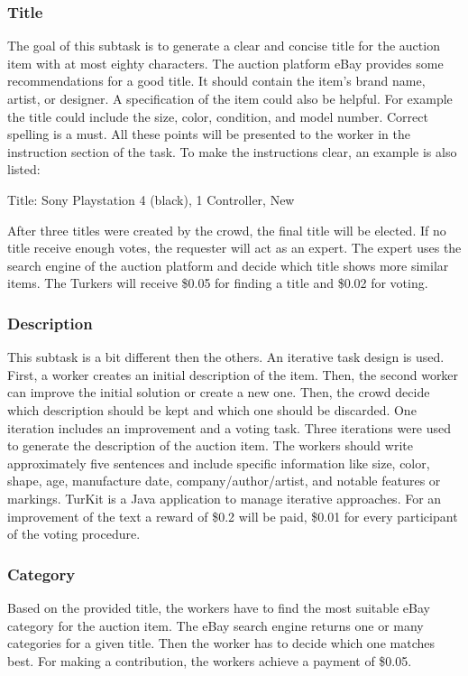 \subsubsection{Title}
The goal of this subtask is to generate a clear and concise title for the auction item with at most eighty characters. The auction platform eBay provides some recommendations for a good title. It should contain the item's brand name, artist, or designer. A specification of the item could also be helpful. For example the title could include the size, color, condition, and model number. Correct spelling is a must. All these points will be presented to the worker in the instruction section of the task. To make the instructions clear, an example is also listed: 

Title: Sony Playstation 4 (black), 1 Controller, New 

After three titles were created by the crowd, the final title will be elected. If no title receive enough votes, the requester will act as an expert. The expert uses the search engine of the auction platform and decide which title shows more similar items. The Turkers will receive \$0.05 for finding a title and \$0.02 for voting.
\subsubsection{Description}
This subtask is a bit different then the others. An iterative task design is used. First, a worker creates an initial description of the item. Then, the second worker can improve the initial solution or create a new one. Then, the crowd decide which description should be kept and which one should be discarded. One iteration includes an improvement and a voting task. Three iterations were used to generate the description of the auction item. The workers should write approximately five sentences and include specific information like size, color, shape, age, manufacture date, company/author/artist, and notable features or markings. TurKit is a Java application to manage iterative approaches. For an improvement of the text a reward of \$0.2 will be paid, \$0.01 for every participant of the voting procedure.
\subsubsection{Category}
Based on the provided title, the workers have to find the most suitable eBay category for the auction item. The eBay search engine returns one or many categories for a given title. Then the worker has to decide which one matches best. For making a contribution, the workers achieve a payment of \$0.05.
